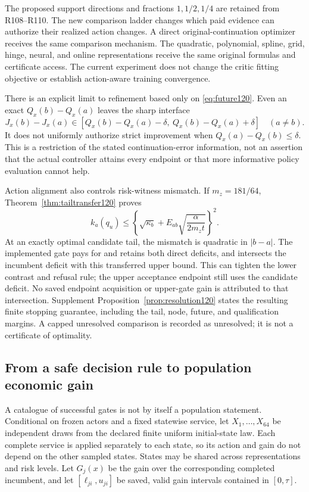 The proposed support directions and fractions $1,1/2,1/4$ are
retained from R108--R110.  The new comparison ladder changes which
paid evidence can authorize their realized action changes.  A direct
original-continuation optimizer receives the same comparison mechanism.
The quadratic, polynomial, spline, grid, hinge, neural, and online
representations receive the same original formulas and certificate
access.  The current experiment does not change the critic fitting
objective or establish action-aware training convergence.

There is an explicit limit to refinement based only on
\eqref{eq:future120}.  Even an exact $Q_x(b)-Q_x(a)$ leaves the
sharp interface
\[
 J_x(b)-J_x(a)\in
 [Q_x(b)-Q_x(a)-\delta,\ Q_x(b)-Q_x(a)+\delta]
 \quad(a\ne b).
\]
It does not uniformly authorize strict improvement when
$Q_x(a)-Q_x(b)\le\delta$.  This is a restriction of the stated
continuation-error information, not an assertion that the actual
controller attains every endpoint or that more informative policy
evaluation cannot help.

Action alignment also controls risk-witness mismatch.  If
$m_z=181/64$, Theorem~\ref{thm:tailtransfer120} proves
\begin{equation}\label{eq:tailtransfer120}
 k_a(q_u)\le
 \left\{\sqrt{\kappa_b}
       +E_{ab}\sqrt{\frac{\alpha}{2m_zt}}\right\}^{\!2}.
\end{equation}
At an exactly optimal candidate tail, the mismatch is quadratic in
$|b-a|$.  The implemented gate pays for and retains both direct
deficits, and intersects the incumbent deficit with this transferred
upper bound.  This can tighten the lower contrast and refusal rule;
the upper acceptance endpoint still uses the candidate deficit.
No saved endpoint acquisition or upper-gate gain is attributed to
that intersection.
Supplement Proposition~\ref{prop:resolution120} states the resulting
finite stopping guarantee, including the tail, node, future, and
qualification margins.  A capped unresolved comparison is recorded
as unresolved; it is not a certificate of optimality.

\subsection{From a safe decision rule to population economic gain}
A catalogue of successful gates is not by itself a population statement.
Conditional on frozen actors and a fixed statewise service, let
$X_1,\ldots,X_{64}$ be independent draws from the declared finite
uniform initial-state law.  Each complete service is applied separately
to each state, so its action and gain do not depend on the other sampled
states.  States may be shared across representations and risk levels.
Let $G_j(x)$ be the gain over the corresponding completed incumbent,
and let $[\ell_{ji},u_{ji}]$ be saved, valid gain intervals contained
in $[0,\tau]$.

